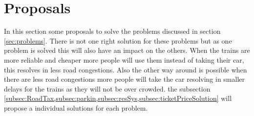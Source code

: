 \section{Proposals}
In this section some proposals to solve the problems discussed in section \ref{sec:problems}. There is not one right solution for these problems but as one problem is solved this will also have an impact on the others. When the trains are more reliable and cheaper more people will use them instead of taking their car, this resolves in less road congestions. Also the other way around is possible when there are less road congestions more people will take the car resolving in smaller delays for the trains as they will not be over crowded. the subsection \cref{subsec:RoadTax,subsec:parkin,subsec:resSys,subsec:ticketPriceSolution} will propose a individual solutions for each problem.

